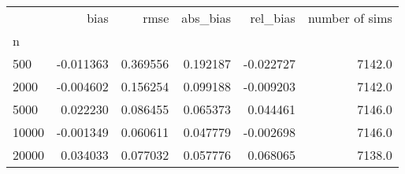 \begin{tabular}{lrrrrr}
\toprule
{} &      bias &      rmse &  abs_bias &  rel_bias &  number of sims \\
n     &           &           &           &           &                 \\
\midrule
500   & -0.011363 &  0.369556 &  0.192187 & -0.022727 &          7142.0 \\
2000  & -0.004602 &  0.156254 &  0.099188 & -0.009203 &          7142.0 \\
5000  &  0.022230 &  0.086455 &  0.065373 &  0.044461 &          7146.0 \\
10000 & -0.001349 &  0.060611 &  0.047779 & -0.002698 &          7146.0 \\
20000 &  0.034033 &  0.077032 &  0.057776 &  0.068065 &          7138.0 \\
\bottomrule
\end{tabular}
